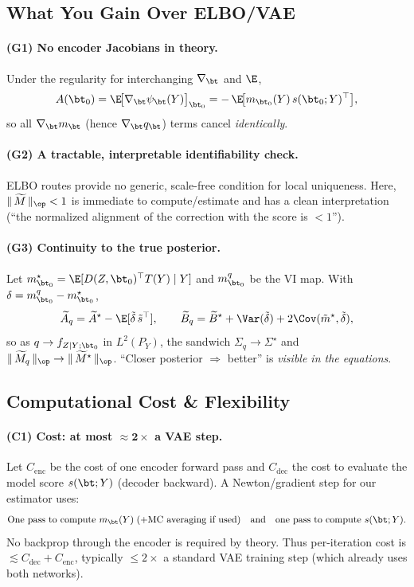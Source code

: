 \subsection*{What You Gain Over ELBO/VAE}

\paragraph{(G1) No encoder Jacobians in theory.}
\begin{lemma}
Under the regularity for interchanging \(\nabla_\bt\) and \(\E\),
\[
A(\bt_0)=\E\!\big[\nabla_\bt \psi_\bt(Y)\big]_{\bt_0}
= -\,\E\!\big[m_{\bt_0}(Y)\,s(\bt_0;Y)^\top\big],
\]
so all \(\nabla_\bt m_\bt\) (hence \(\nabla_\bt q_\bt\)) terms cancel \emph{identically}.
\end{lemma}

\paragraph{(G2) A tractable, interpretable identifiability check.}
ELBO routes provide no generic, scale-free condition for local uniqueness. Here, \(\|\,\widetilde M\,\|_{\op}<1\) is immediate to compute/estimate and has a clean interpretation (“the normalized alignment of the correction with the score is $<1$”).

\paragraph{(G3) Continuity to the true posterior.}
Let \(m^\star_{\bt_0}=\E[D(Z,\bt_0)^\top T(Y)\mid Y]\) and \(m^q_{\bt_0}\) be the VI map. With \(\delta=m^q_{\bt_0}-m^\star_{\bt_0}\),
\[
\widetilde A_q=\widetilde A^\star-\E[\tilde\delta\,\tilde s^\top],\qquad
\widetilde B_q=\widetilde B^\star+\Var(\tilde\delta)+2\Cov(\tilde m^\star,\tilde\delta),
\]
so as \(q\to f_{Z\mid Y;\bt_0}\) in \(L^2(P_Y)\), the sandwich \(\Sigma_q\to\Sigma^\star\) and \(\|\,\widetilde M_q\,\|_{\op}\to\|\,\widetilde M^\star\,\|_{\op}\). “Closer posterior \(\Rightarrow\) better” is \emph{visible in the equations}.

\subsection*{Computational Cost \& Flexibility}

\paragraph{(C1) Cost: at most \(\mathbf{\approx 2\times}\) a VAE step.}
Let \(C_{\text{enc}}\) be the cost of one encoder forward pass and \(C_{\text{dec}}\) the cost to evaluate the model score \(s(\bt;Y)\) (decoder backward). A Newton/gradient step for our estimator uses:
\[
\text{One pass to compute } m_\bt(Y) \;(+\text{MC averaging if used}) \quad\text{and}\quad
\text{one pass to compute } s(\bt;Y).
\]
No backprop through the encoder is required by theory. Thus per-iteration cost is \(\lesssim C_{\text{dec}} + C_{\text{enc}}\), typically \(\le 2\times\) a standard VAE training step (which already uses both networks).

